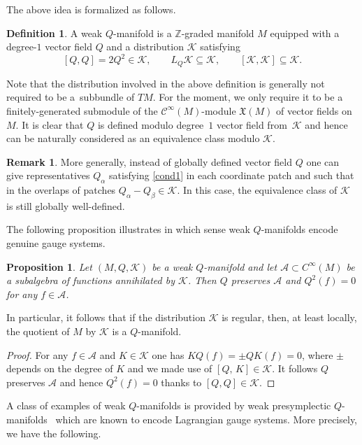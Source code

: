 \documentclass[pdftex]{sigma}
\numberwithin{equation}{section}
\newtheorem{Proposition}[Theorem]{Proposition}
\theoremstyle{definition}
\newtheorem{Definition}[Theorem]{Definition}
\newtheorem{Remark}[Theorem]{Remark}
\newcommand{\commut}[2]{[#1{,}\,#2]}
\newcommand{\cC}{\mathcal{C}}
\def\cK{\mathcal{K}}
\begin{document}
The above idea is formalized as follows.

\begin{Definition}
 A weak $Q$-manifold is a $\mathbb{Z}$-graded manifold $M$ equipped with a degree-$1$ vector field $Q$ and a distribution $\mathcal{K}$ satisfying
\begin{equation}\label{cond1}
 [Q,Q]=2Q^2\in \mathcal{K},\qquad L_Q\mathcal{K}\subseteq \mathcal{K},\qquad [\mathcal{K},\mathcal{K}]\subseteq \mathcal{K}.
\end{equation}
\end{Definition}
Note that the distribution involved in the above definition is generally not required to be a~subbundle of $TM$. For the moment, we only require it to be a finitely-generated submodule of the $\cC^\infty(M)$-module $\mathfrak{X}(M)$ of vector fields on $M$. It is clear that $Q$ is defined modulo degree~$1$ vector field from~$\cK$ and hence can be naturally considered as an equivalence class modulo $\cK$.
\begin{Remark}
 More generally, instead of globally defined vector field $Q$ one can give representatives $Q_\alpha$ satisfying \eqref{cond1} in each coordinate patch and such that in the overlaps of patches $Q_\alpha-Q_\beta \in \cK$. In this case, the equivalence class of $\cK$ is still globally well-defined.
\end{Remark}


The following proposition illustrates in which sense weak $Q$-manifolds encode
genuine gauge systems.

\begin{Proposition}\label{prop1}
 Let $(M,Q,\mathcal{K})$ be a weak $Q$-manifold and let $\mathcal{A}\subset C^{\infty}(M)$ be a subalgebra of functions annihilated by $\mathcal{K}$. Then $Q$ preserves $\mathcal{A}$ and $Q^2(f)=0$ for any $f\in\mathcal{A}$.
\end{Proposition}
In particular, it follows that if the distribution $\mathcal{K}$ is regular, then, at least locally, the quotient of $M$ by $\mathcal{K}$ is a $Q$-manifold.

\begin{proof}
For any $f\in\mathcal{A}$ and $K\in\mathcal{K}$ one has $KQ(f)=\pm QK(f)=0$, where $\pm$ depends on the degree of $K$ and we made use of $\commut{Q}{K}\in \cK$. It follows $Q$ preserves $\mathcal{A}$ and hence $Q^2(f)=0$ thanks to $[Q,Q]\in \mathcal{K}$.
\end{proof}

A class of examples of weak $Q$-manifolds is provided by weak presymplectic $Q$-manifolds~{\cite{Dneprov:2024cvt, Grigoriev:2022zlq}} which are known to encode Lagrangian gauge systems. More precisely, we have the following.
\end{document}
